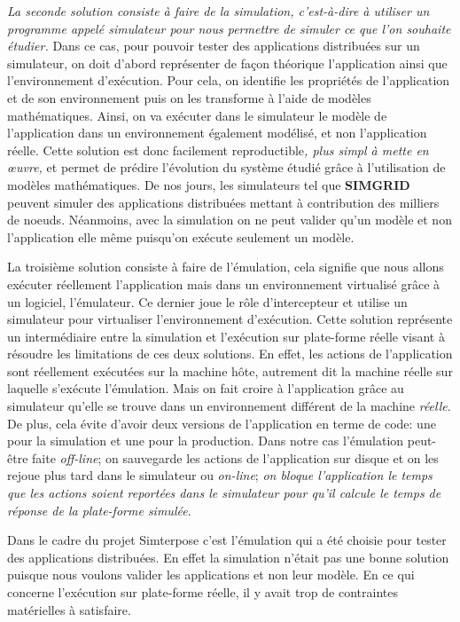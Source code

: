 {\color{red}\textit{La seconde solution consiste à faire de la simulation, c'est-à-dire à utiliser un programme appelé simulateur pour nous permettre de simuler ce que l'on souhaite étudier.}} Dans ce cas, pour pouvoir tester des applications distribuées sur un simulateur, on doit d'abord représenter de façon théorique l'application ainsi que l'environnement d'exécution. Pour cela, on identifie les propriétés de l'application et de son environnement puis on les transforme à l'aide de modèles mathématiques. Ainsi, on va exécuter dans le simulateur le modèle de l'application dans un environnement également modélisé, et non l'application réelle. Cette solution est donc facilement reproductible\textit{, plus simpl à mette en \oe uvre,} et permet de prédire l'évolution du système étudié grâce à l'utilisation de modèles mathématiques. De nos jours, les simulateurs tel que  \textbf{SIMGRID}\citet{CASANOVA:SimGrid, MARTIN:SimGrid} peuvent simuler des applications distribuées mettant à contribution des milliers de noeuds. Néanmoins, avec la simulation on ne peut valider qu'un modèle et non l'application elle même puisqu'on exécute seulement un modèle. 

La troisième solution consiste à faire de l'émulation, cela signifie que nous allons exécuter réellement l'application mais dans un environnement virtualisé grâce à un logiciel, l'émulateur. Ce dernier joue le rôle d'intercepteur et utilise un simulateur pour virtualiser l'environnement d'exécution.
Cette solution représente un intermédiaire entre la simulation et l'exécution sur plate-forme réelle visant à résoudre les limitations de ces deux solutions. En effet, les actions de l'application sont réellement exécutées sur la machine hôte, autrement dit la machine réelle sur laquelle s'exécute l'émulation. Mais on fait croire à l'application grâce au simulateur qu'elle se trouve dans un environnement différent de la machine \textit{réelle}. De plus, cela évite d'avoir deux versions de l'application en terme de code: une pour la simulation et une pour la production. Dans notre cas l'émulation peut-être faite \textit{off-line}; on sauvegarde les actions de l'application sur disque et on les rejoue plus tard dans le simulateur ou \textit{on-line}; \textit{ on bloque l'application le temps que les actions soient reportées dans le simulateur pour qu'il calcule le temps de réponse de la plate-forme simulée}.

Dans le cadre du projet Simterpose c'est l'émulation qui a été choisie pour tester des applications distribuées. En effet la simulation n'était pas une bonne solution puisque nous voulons valider les applications et non leur modèle. En ce qui concerne l'exécution sur plate-forme réelle, il y avait trop de contraintes matérielles à satisfaire.

